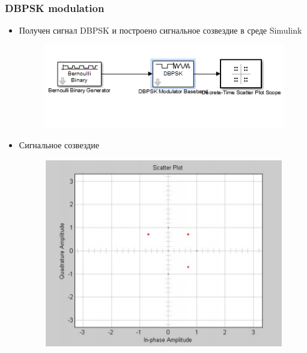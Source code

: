 \documentclass[10pt,a4paper]{article}
\begin{document}
\subsubsection{DBPSK modulation}
\begin{itemize}
\item Получен сигнал DBPSK и построено сигнальное созвездие в среде Simulink
\begin{figure}[h]
\centering
\includegraphics[width=12cm]{sim2_1.png} 
\end{figure}
\item Сигнальное созвездие
\begin{figure}[h]
\centering
\includegraphics[width=12cm]{sim2.png} 
\end{figure}
\end{itemize}
\newpage
\FloatBarrier
\end{document}

